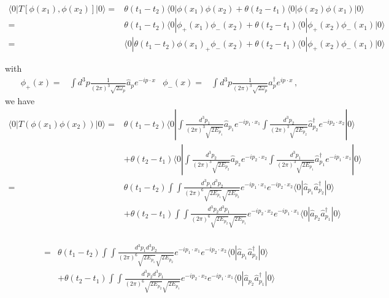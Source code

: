 \begin{align}
    \langle0|T\left[\phi(x_1),\phi(x_2)\right]|0\rangle=&\theta(t_1-t_2)\langle0|\phi(x_1)\phi(x_2)+\theta(t_2-t_1)\langle0|\phi(x_2)\phi(x_1)|0\rangle\nonumber\\
   =&\theta(t_1-t_2)\langle0|\phi_+(x_1)\phi_-(x_2)+\theta(t_2-t_1)\langle0|\phi_+(x_2)\phi_-(x_1)|0\rangle\nonumber\\
     =&\langle0|\theta(t_1-t_2)\phi(x_1)_+\phi_-(x_2)+\theta(t_2-t_1)\langle0|\phi_+(x_2)\phi_-(x_1)|0\rangle
\end{align}

with
\begin{align}
    \phi_+(x)=&\int d^3p \frac{1}{(2\pi)^3\sqrt{2\omega_{p} }}
\widehat{a}_{p} e^{-i p\cdot x }&
    \phi_-(x)=&\int d^3p \frac{1}{(2\pi)^3\sqrt{2\omega_{p} }}
\widehat{a}_{p}^\dagger e^{i p\cdot x }\,,
\end{align}
we have
\begin{align}
  \langle0|T(\phi(x_1)\phi(x_2))|0\rangle
=&\theta(t_1-t_2)\langle0|\int\frac{d^3p_1}{(2\pi)^3\sqrt{2E_{p_1}}}\hat{a}_{p_1}e^{-i p_1\cdot x_1}
\int\frac{d^3p_2}{(2\pi)^3\sqrt{2E_{p_2}}}\hat{a}_{p_2}^\dagger e^{-i p_2\cdot x_2}|0\rangle\nonumber\\
&+\theta(t_2-t_1)\langle0|\int\frac{d^3p_2}{(2\pi)^3\sqrt{2E_{p_2}}}\hat{a}_{p_2}e^{-i p_2\cdot x_2}
\int\frac{d^3p_1}{(2\pi)^3\sqrt{2E_{p_1}}}\hat{a}_{p_1}^\dagger e^{-i p_1\cdot x_1}|0\rangle\nonumber\\
=&\theta(t_1-t_2)\int\int\frac{d^3p_1d^3p_2}{(2\pi)^6\sqrt{2E_{p_1}}\sqrt{2E_{p_2}}}e^{-i p_1\cdot x_1}e^{-i p_2\cdot x_2}
\langle0|\hat{a}_{p_1}\hat{a}_{p_2}^\dagger|0\rangle\nonumber\\
&+\theta(t_2-t_1)\int\int\frac{d^3p_2d^3p_1}{(2\pi)^6\sqrt{2E_{p_2}}\sqrt{2E_{p_1}}}e^{-i p_2\cdot x_2}e^{-i p_1\cdot x_1}
\langle0|\hat{a}_{p_2}\hat{a}_{p_1}^\dagger|0\rangle\nonumber\\
\end{align}

\begin{align}
=&\theta(t_1-t_2)\int\int\frac{d^3p_1d^3p_2}{(2\pi)^6\sqrt{2E_{p_1}}\sqrt{2E_{p_2}}}e^{-i p_1\cdot x_1}e^{-i p_2\cdot x_2}
\langle0|\hat{a}_{p_1}\hat{a}_{p_2}^\dagger|0\rangle\nonumber\\
&+\theta(t_2-t_1)\int\int\frac{d^3p_2d^3p_1}{(2\pi)^6\sqrt{2E_{p_2}}\sqrt{2E_{p_1}}}e^{-i p_2\cdot x_2}e^{-i p_1\cdot x_1}
\langle0|\hat{a}_{p_2}\hat{a}_{p_1}^\dagger|0\rangle\nonumber\\
\end{align}

